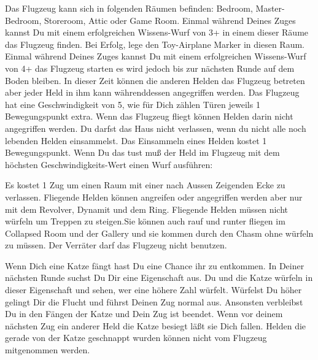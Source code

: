   \begin{itemize}
       \itemsep-5pt
    \bitem Das Flugzeug kann sich in folgenden Räumen befinden: Bedroom, Master-Bedroom, Storeroom, Attic oder Game Room. Einmal während Deines Zuges kannst Du mit einem erfolgreichen Wissens-Wurf von 3+ in einem dieser Räume das Flugzeug finden. Bei Erfolg, lege den Toy-Airplane Marker in diesen Raum.
    \bitem Einmal während Deines Zuges kannst Du mit einem erfolgreichen Wissens-Wurf von 4+ das Flugzeug starten es wird jedoch bis zur nächsten Runde auf dem Boden bleiben. In dieser Zeit können die anderen Helden das Flugzeug betreten aber jeder Held in ihm kann währenddessen angegriffen werden.
    \bitem Das Flugzeug hat eine Geschwindigkeit von 5, wie für Dich zählen Türen jeweils 1 Bewegungspunkt extra.
     Wenn das Flugzeug fliegt können Helden darin nicht angegriffen werden.
    \bitem Du darfst das Haus nicht verlassen, wenn du nicht alle noch lebenden Helden einsammelst.
    \bitem Das Einsammeln eines Helden kostet 1 Bewegungspunkt. Wenn Du das tust muß der Held im Flugzeug mit dem höchsten Geschwindigkeits-Wert einen Wurf ausführen:
    \vspace{-10pt}
    \rolls
    \erolls

    \bitem Es kostet 1 Zug um einen Raum mit einer nach Aussen Zeigenden Ecke zu verlassen.
    \bitem Fliegende Helden können angreifen oder angegriffen werden aber nur mit dem Revolver, Dynamit und dem Ring.
    \bitem Fliegende Helden müssen nicht würfeln um Treppen zu steigen.Sie können auch rauf und runter fliegen im Collapsed Room und der Gallery und sie kommen durch den Chasm ohne würfeln zu müssen.
    \bitem Der Verräter darf das Flugzeug nicht benutzen.
    \end{itemize}


  \begin{itemize}
           \itemsep-5pt

        \bitem Wenn Dich eine Katze fängt hast Du eine Chance ihr zu entkommen. In Deiner nächsten Runde suchst Du Dir eine Eigenschaft aus. Du und die Katze würfeln in dieser Eigenschaft und sehen, wer eine höhere Zahl würfelt.
        \bitem Würfelst Du höher gelingt Dir die Flucht und führst Deinen Zug normal aus. Ansonsten verbleibst Du in den Fängen der Katze und Dein Zug ist beendet. Wenn vor deinem nächsten Zug ein anderer Held die Katze besiegt läßt sie Dich fallen.
        \bitem Helden die gerade von der Katze geschnappt wurden können nicht vom Flugzeug mitgenommen werden.
    \end{itemize}

